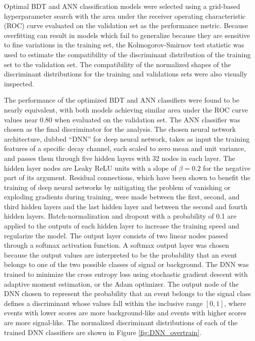 Optimal BDT and ANN classification models were selected using a grid-based hyperparameter search with the area under the receiver operating characteristic (ROC) curve evaluated on the validation set as the performance metric. Because overfitting can result in models which fail to generalize because they are sensitive to fine variations in the training set, the Kolmogorov-Smirnov test statistic was used to estimate the compatibility of the discriminant distribution of the training set to the validation set. The compatibility of the normalized shapes of the discriminant distributions for the training and validations sets were also visually inspected.

The performance of the optimized BDT and ANN classifiers were found to be nearly equivalent, with both models achieving similar area under the ROC curve values near 0.80 when evaluated on the validation set. The ANN classifier was chosen as the final discriminator for the analysis. The chosen neural network architecture, dubbed ``DNN'' for deep neural network, takes as input the training features of a specific decay channel, each scaled to zero mean and unit variance, and passes them through five hidden layers with 32 nodes in each layer. The hidden layer nodes are Leaky ReLU units with a slope of $\beta = 0.2$ for the negative part of its argument. Residual connections\cite{RESCONNECT}, which have been shown to benefit the training of deep neural networks by mitigating the problem of vanishing or exploding gradients during training, were made between the first, second, and third hidden layers and the last hidden layer and between the second and fourth hidden layers. Batch-normalization and dropout with a probability of 0.1 are applied to the outputs of each hidden layer to increase the training speed and regularize the model. The output layer consists of two linear nodes passed through a softmax activation function. A softmax output layer was chosen because the output values are interpreted to be the probability that an event belongs to one of the two possible classes of signal or background. The DNN was trained to minimize the cross entropy loss using stochastic gradient descent with adaptive moment estimation, or the Adam optimizer. The output node of the DNN chosen to represent the probability that an event belongs to the signal class defines a discriminant whose values fall within the inclusive range $[0, 1]$, where events with lower scores are more background-like and events with higher scores are more signal-like. The normalized discriminant distributions of each of the trained DNN classifiers are shown in Figure \ref{fig:DNN_overtrain}.

